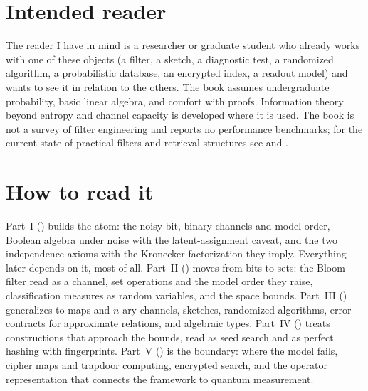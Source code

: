 \section*{Intended reader}

The reader I have in mind is a researcher or graduate student who already
works with one of these objects (a filter, a sketch, a diagnostic test, a
randomized algorithm, a probabilistic database, an encrypted index, a readout
model) and wants to see it in relation to the others. The book assumes
undergraduate probability, basic linear algebra, and comfort with proofs.
Information theory beyond entropy and channel capacity is developed where it is
used. The book is not a survey of filter engineering and reports no
performance benchmarks; for the current state of practical filters and
retrieval structures see \textcite{graf-lemire-2022} and
\textcite{dietzfelbinger-et-al-2026-ribbon}.

\section*{How to read it}

Part~I ()
builds the atom: the noisy bit, binary channels and model order, Boolean
algebra under noise with the latent-assignment caveat, and the two
independence axioms with the Kronecker factorization they imply. Everything
later depends on it,  most of all.
Part~II ()
moves from bits to sets: the Bloom filter read as a channel, set operations
and the model order they raise, classification measures as random variables,
and the space bounds. Part~III
()
generalizes to maps and $n$-ary channels, sketches, randomized algorithms,
error contracts for approximate relations, and algebraic types. Part~IV
() treats constructions
that approach the bounds, read as seed search and as perfect hashing with
fingerprints. Part~V
()
is the boundary: where the model fails, cipher maps and trapdoor computing,
encrypted search, and the operator representation that connects the
framework to quantum measurement.

